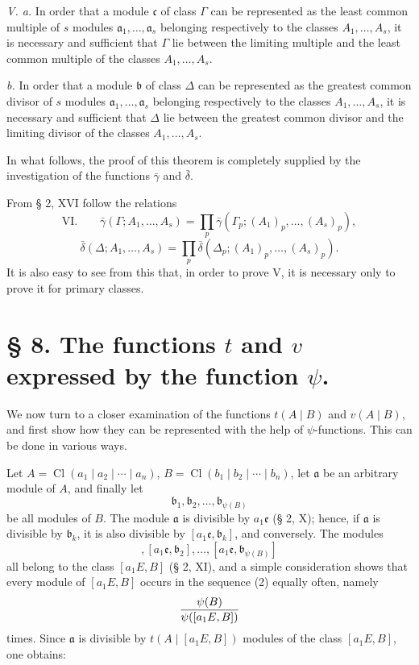 \documentclass[11pt,a4paper]{article}
\newcommand{\Cl}{\operatorname{Cl}}
\begin{document}
\emph{V. a.} In order that a module $\mathfrak c$ of class $\Gamma$ can be represented as the least common multiple of $s$ modules $\mathfrak a_1,\ldots,\mathfrak a_s$ belonging respectively to the classes $A_1,\ldots,A_s$, it is necessary and sufficient that $\Gamma$ lie between the limiting multiple and the least common multiple of the classes $A_1,\ldots,A_s$.

\emph{b.} In order that a module $\mathfrak b$ of class $\Delta$ can be represented as the greatest common divisor of $s$ modules $\mathfrak a_1,\ldots,\mathfrak a_s$ belonging respectively to the classes $A_1,\ldots,A_s$, it is necessary and sufficient that $\Delta$ lie between the greatest common divisor and the limiting divisor of the classes $A_1,\ldots,A_s$.

In what follows, the proof of this theorem is completely supplied by the investigation of the functions $\bar\gamma$ and $\bar\delta$.

From § 2, XVI follow the relations
\[
\text{VI.}\qquad
 \bar\gamma(\Gamma;A_1,\ldots,A_s)
 =\prod_p \bar\gamma(\Gamma_p;(A_1)_p,\ldots,(A_s)_p),
\]
\[
 \bar\delta(\Delta;A_1,\ldots,A_s)
 =\prod_p \bar\delta(\Delta_p;(A_1)_p,\ldots,(A_s)_p).
\]
It is also easy to see from this that, in order to prove V, it is necessary only to prove it for primary classes.

\section*{§ 8. The functions $t$ and $v$ expressed by the function $\psi$.}

We now turn to a closer examination of the functions $t(A\mid B)$ and $v(A\mid B)$, and first show how they can be represented with the help of $\psi$-functions. This can be done in various ways.

Let $A=\Cl(a_1\mid a_2\mid\cdots\mid a_n)$, $B=\Cl(b_1\mid b_2\mid\cdots\mid b_n)$, let $\mathfrak a$ be an arbitrary module of $A$, and finally let
\begin{equation}
 \mathfrak b_1,\mathfrak b_2,\ldots,\mathfrak b_{\psi(B)}
\tag{1}
\end{equation}
be all modules of $B$. The module $\mathfrak a$ is divisible by $a_1\mathfrak e$ (§ 2, X); hence, if $\mathfrak a$ is divisible by $\mathfrak b_k$, it is also divisible by $[a_1\mathfrak e,\mathfrak b_k]$, and conversely. The modules
\begin{equation}
 [a_1\mathfrak e,\mathfrak b_1],
 [a_1\mathfrak e,\mathfrak b_2],\ldots,
 [a_1\mathfrak e,\mathfrak b_{\psi(B)}]
\tag{2}
\end{equation}
all belong to the class $[a_1E,B]$ (§ 2, XI), and a simple consideration shows that every module of $[a_1E,B]$ occurs in the sequence (2) equally often, namely
\[
 {\psi(B)\over\psi([a_1E,B])}
\]
times. Since $\mathfrak a$ is divisible by $t(A\mid [a_1E,B])$ modules of the class $[a_1E,B]$, one obtains:
\end{document}
